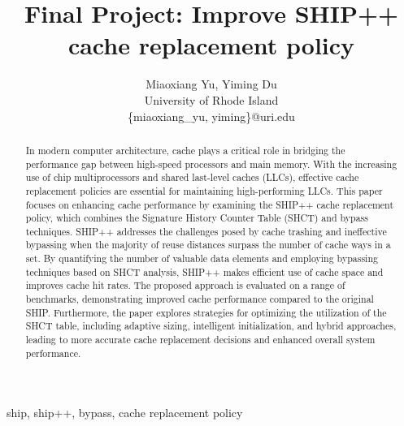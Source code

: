 \documentclass[conference]{IEEEtran}
\begin{document}
\title{Final Project: Improve SHIP++ cache replacement policy}

\author{
Miaoxiang Yu, Yiming Du\\
University of Rhode Island\\
\{miaoxiang\_yu, yiming\}@uri.edu
}

\maketitle

\begin{abstract}
In modern computer architecture, cache plays a critical role in bridging the performance gap between high-speed processors and main memory. With the increasing use of chip multiprocessors and shared last-level caches (LLCs), effective cache replacement policies are essential for maintaining high-performing LLCs. This paper focuses on enhancing cache performance by examining the SHIP++ cache replacement policy, which combines the Signature History Counter Table (SHCT) and bypass techniques. SHIP++ addresses the challenges posed by cache trashing and ineffective bypassing when the majority of reuse distances surpass the number of cache ways in a set. By quantifying the number of valuable data elements and employing bypassing techniques based on SHCT analysis, SHIP++ makes efficient use of cache space and improves cache hit rates. The proposed approach is evaluated on a range of benchmarks, demonstrating improved cache performance compared to the original SHIP. Furthermore, the paper explores strategies for optimizing the utilization of the SHCT table, including adaptive sizing, intelligent initialization, and hybrid approaches, leading to more accurate cache replacement decisions and enhanced overall system performance.
\end{abstract}

\begin{IEEEkeywords}
ship, ship++, bypass, cache replacement policy
\end{IEEEkeywords}













\end{document}
